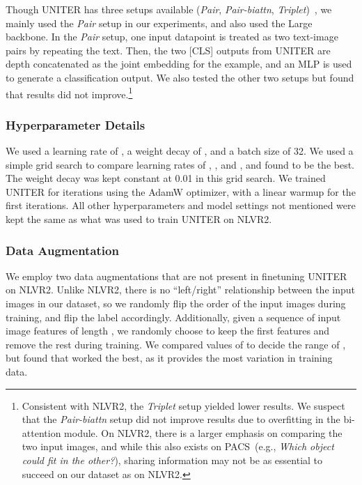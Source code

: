 \documentclass[runningheads]{llncs}
\newcommand{\names}{\textsc{PACS}}
\begin{document}
Though UNITER has three setups available (\textit{Pair}, \textit{Pair-biattn}, \textit{Triplet})~\cite{chen2020uniter}, we mainly used the \textit{Pair} setup in our experiments, and also used the Large backbone. In the \textit{Pair} setup,  one input datapoint is treated as two
text-image pairs by repeating the text. Then, the two [CLS] outputs from UNITER are depth concatenated as the joint embedding for the example, and an MLP is used to generate a classification output. We also tested the other two setups but found that results did not improve.\footnote{Consistent with NLVR2, the \textit{Triplet} setup yielded lower results. We suspect that the \textit{Pair-biattn} setup did not improve results due to  overfitting in the bi-attention module. On NLVR2, there is a larger emphasis on comparing the two input images, and while this also exists on \names\ (e.g., \textit{Which object could fit in the other?}), sharing information may not be as essential to succeed on our dataset as on NLVR2.}

\subsubsection{Hyperparameter Details} We used a learning rate of , a weight decay of , and a batch size of 32. We used a simple grid search to compare learning rates of , , and , and found  to be the best. The weight decay was kept constant at 0.01 in this grid search. We trained UNITER for  iterations using the AdamW optimizer, with a linear warmup for the first  iterations. All other hyperparameters and model settings not mentioned were kept the same as what was used to train UNITER on NLVR2. 

\subsubsection{Data Augmentation}

We employ two data augmentations that are not present in finetuning UNITER on NLVR2. Unlike NLVR2, there is no ``left/right'' relationship between the input images in our dataset, so we randomly flip the order of the input images during training, and flip the label accordingly. Additionally, given a sequence of input image features of length , we randomly choose to keep the first  features and remove the rest during training. We compared values of  to decide the range of , but found that  worked the best, as it provides the most variation in training data. 
\end{document}
